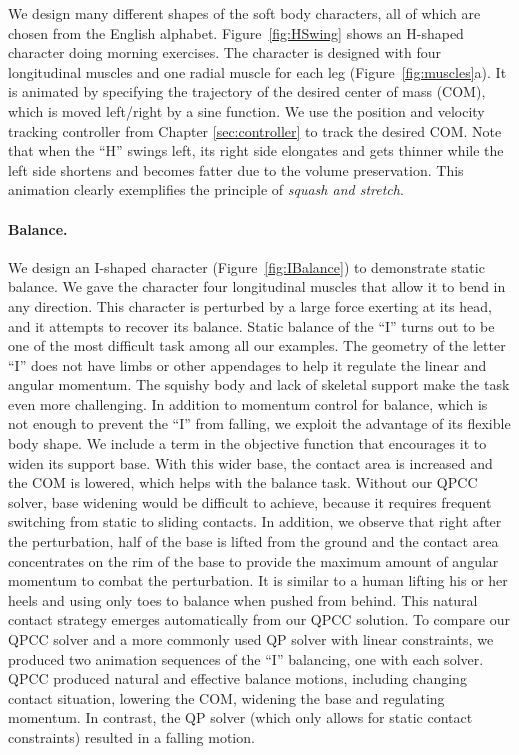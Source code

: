 We design many different shapes of the soft body characters, all of
which are chosen from the English alphabet. Figure~\ref{fig:HSwing} shows
an H-shaped character doing morning exercises. The character is designed
with four longitudinal muscles and one radial muscle for each
leg (Figure~\ref{fig:muscles}a). It is animated by specifying the
trajectory of the desired center of mass (COM), which is moved left/right
by a sine function. We use the position and velocity tracking controller
from Chapter \ref{sec:controller} to track the desired COM. Note that when
the ``H'' swings left, its right side elongates and gets thinner while the
left side shortens and becomes fatter due to the volume preservation. This
animation clearly exemplifies the principle of \emph{squash and stretch}.

\paragraph{Balance.} We design an I-shaped character
(Figure~\ref{fig:IBalance}) to demonstrate static balance.  We gave
the character four longitudinal muscles that allow it to bend in any
direction.
This character is perturbed by a large force exerting at
its head, and it attempts to recover its balance. Static balance of
the ``I'' turns out to be one of the most difficult task among all our
examples. The geometry of the letter ``I'' does not have limbs or
other appendages to help it regulate the linear and angular
momentum. The squishy body and lack of skeletal support make the task
even more challenging. In addition to momentum control for balance,
which is not enough to prevent the ``I'' from falling, we exploit the
advantage of its flexible body shape.  We include a term in the
objective function that encourages it to widen its support base.  With
this wider base, the contact area is increased and the COM is lowered,
which helps with the balance task. Without our QPCC solver, base widening would be difficult
to achieve, because it requires frequent switching from static to sliding contacts.
In addition, we observe that right
after the perturbation, half of the base is lifted from the ground and
the contact area concentrates on the rim of the base to provide the maximum
amount of angular momentum to combat the perturbation. It is similar
to a human lifting his or her heels and using only toes to balance
when pushed from behind. This natural contact strategy
emerges automatically from our QPCC solution.  To compare our
QPCC solver and a more commonly used QP solver with linear
constraints, we produced two animation sequences of the ``I''
balancing, one with each solver.  QPCC produced natural and effective
balance motions, including changing contact situation, lowering the
COM, widening the base and regulating momentum. In contrast, the QP
solver (which only allows for static contact constraints) resulted in a falling motion.

